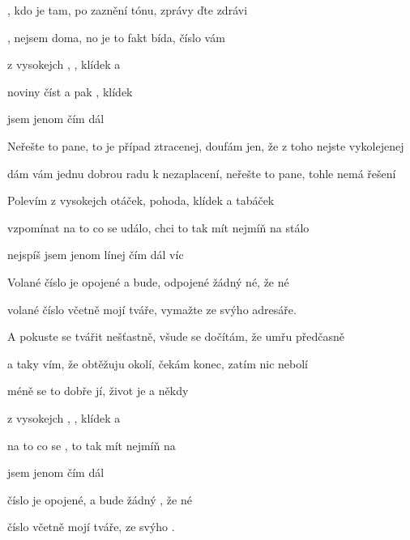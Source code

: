 
\zs
{}, kdo je tam, po zaznění tónu,
 zprávy ďte zdrávi

, nejsem doma, no je to fakt bída,
 číslo vám 
\ks

\zr
{} z vysokejch ,
, klídek a 

 {noviny} číst a pak ,
 klídek 

 jsem jenom  čím dál 
\kr

\zs
Neřešte to pane, to je případ ztracenej,
doufám jen, že z toho nejste vykolejenej

dám vám jednu dobrou radu k nezaplacení,
neřešte to pane, tohle nemá řešení

\ks

\zr
Polevím z vysokejch otáček,
pohoda, klídek a tabáček

vzpomínat na to co se událo,
chci to tak mít nejmíň na stálo

nejspíš jsem jenom línej čím dál víc
\kr

\zs
Volané číslo je opojené a bude,
odpojené žádný né, že né

volané číslo včetně mojí tváře,
vymažte ze svýho adresáře.

\ks

\zr
A pokuste se tvářit nešťastně,
všude se dočítám, že umřu předčasně

a taky vím, že obtěžuju okolí,
čekám konec, zatím nic nebolí

méně se to dobře jí,
život je  a někdy 
\kr


  
  

\zr
{} z vysokejch ,
, klídek a 

 na to co se ,
 to tak mít nejmíň na 

 jsem jenom  čím dál 
\kr

\zs
{} číslo je opojené,
a bude  žádný , že né

 číslo včetně mojí tváře,
 ze svýho .

